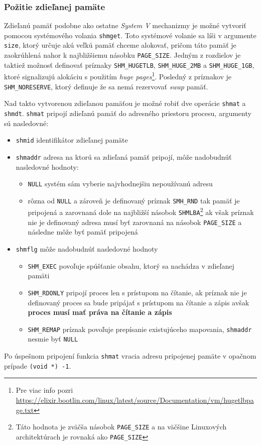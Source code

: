 \subsubsection{Požitie zdieľanej pamäte} \label{shmuse}
Zdieľanú pamäť podobne ako ostatne \textit{System V} mechanizmy je možné vytvoriť pomocou systémového volania \texttt{shmget}. Toto systémové volanie sa líši v argumente \texttt{size}, ktorý určuje akú veľkú pamäť chceme alokovať, pričom táto pamäť je zaokrúhlená nahor k najbližšiemu násobku \texttt{PAGE\_SIZE}. Jedným z rozdielov je taktiež možnosť definovať príznaky \texttt{SHM\_HUGETLB}, \texttt{SHM\_HUGE\_2MB} a \texttt{SHM\_HUGE\_1GB}, ktoré signalizujú alokáciu s použitím \textit{huge pages}\footnote{Pre viac info pozri \url{https://elixir.bootlin.com/linux/latest/source/Documentation/vm/hugetlbpage.txt}}. Posledný z príznakov je \texttt{SHM\_NORESERVE}, ktorý definuje že sa nemá rezervovať \textit{swap} pamäť.

Nad takto vytvorenou zdieľanou pamäťou je možné robiť dve operácie \texttt{shmat} a \texttt{shmdt}. \texttt{shmat} pripojí zdieľanú pamäť do adresného priestoru procesu, argumenty sú nasledovné:
\begin{itemize}
\item \texttt{shmid} identifikátor zdieľanej pamäte
\item \texttt{shmaddr} adresa na ktorú sa zdieľaná pamäť pripojí, môže nadobudnúť nasledovné hodnoty:
\begin{itemize}
\item \texttt{NULL} systém sám vyberie najvhodnejšiu nepoužívanú adresu
\item rôzna od \texttt{NULL} a zároveň je definovaný príznak \texttt{SMH\_RND} tak pamäť je pripojená a zarovnaná dole na najbližší násobok  \texttt{SHMLBA}\footnote{Táto hodnota je zväčša násobok \texttt{PAGE\_SIZE} a na väčšine Linuxových architektúrach je rovnaká ako \texttt{PAGE\_SIZE}} ak však príznak nie je definovaný adresa musí byť zarovnaná na násobok \texttt{PAGE\_SIZE} a následne môže byť pamäť pripojená
\end{itemize}
\item \texttt{shmflg} môže nadobudnúť nasledovné hodnoty
\begin{itemize}
\item \texttt{SHM\_EXEC} povoľuje spúšťanie obsahu, ktorý sa nachádza v zdieľanej pamäti 
\item \texttt{SHM\_RDONLY} pripojí proces len s prístupom na čítanie, ak príznak nie je definovaný proces sa bude pripájať s prístupom na čítanie a zápis avšak \textbf{proces musí mať práva na čítanie a zápis} 
\item \texttt{SHM\_REMAP} príznak povoľuje prepísanie existujúceho mapovania, \texttt{shmaddr} nesmie byť \texttt{NULL}
\end{itemize}
\end{itemize}
Po úspešnom pripojení funkcia \texttt{shmat} vracia adresu pripojenej pamäte v opačnom prípade \texttt{(void *) -1}. 

